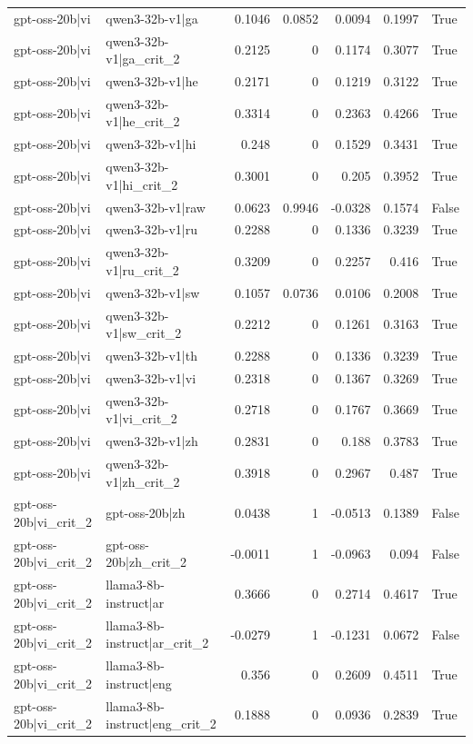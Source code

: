 \begin{table}
\begin{tabular}{l l r r r r l}
gpt-oss-20b|vi & qwen3-32b-v1|ga & 0.1046 & 0.0852 & 0.0094 & 0.1997 & True \\
gpt-oss-20b|vi & qwen3-32b-v1|ga_crit_2 & 0.2125 & 0 & 0.1174 & 0.3077 & True \\
gpt-oss-20b|vi & qwen3-32b-v1|he & 0.2171 & 0 & 0.1219 & 0.3122 & True \\
gpt-oss-20b|vi & qwen3-32b-v1|he_crit_2 & 0.3314 & 0 & 0.2363 & 0.4266 & True \\
gpt-oss-20b|vi & qwen3-32b-v1|hi & 0.248 & 0 & 0.1529 & 0.3431 & True \\
gpt-oss-20b|vi & qwen3-32b-v1|hi_crit_2 & 0.3001 & 0 & 0.205 & 0.3952 & True \\
gpt-oss-20b|vi & qwen3-32b-v1|raw & 0.0623 & 0.9946 & -0.0328 & 0.1574 & False \\
gpt-oss-20b|vi & qwen3-32b-v1|ru & 0.2288 & 0 & 0.1336 & 0.3239 & True \\
gpt-oss-20b|vi & qwen3-32b-v1|ru_crit_2 & 0.3209 & 0 & 0.2257 & 0.416 & True \\
gpt-oss-20b|vi & qwen3-32b-v1|sw & 0.1057 & 0.0736 & 0.0106 & 0.2008 & True \\
gpt-oss-20b|vi & qwen3-32b-v1|sw_crit_2 & 0.2212 & 0 & 0.1261 & 0.3163 & True \\
gpt-oss-20b|vi & qwen3-32b-v1|th & 0.2288 & 0 & 0.1336 & 0.3239 & True \\
gpt-oss-20b|vi & qwen3-32b-v1|vi & 0.2318 & 0 & 0.1367 & 0.3269 & True \\
gpt-oss-20b|vi & qwen3-32b-v1|vi_crit_2 & 0.2718 & 0 & 0.1767 & 0.3669 & True \\
gpt-oss-20b|vi & qwen3-32b-v1|zh & 0.2831 & 0 & 0.188 & 0.3783 & True \\
gpt-oss-20b|vi & qwen3-32b-v1|zh_crit_2 & 0.3918 & 0 & 0.2967 & 0.487 & True \\
gpt-oss-20b|vi_crit_2 & gpt-oss-20b|zh & 0.0438 & 1 & -0.0513 & 0.1389 & False \\
gpt-oss-20b|vi_crit_2 & gpt-oss-20b|zh_crit_2 & -0.0011 & 1 & -0.0963 & 0.094 & False \\
gpt-oss-20b|vi_crit_2 & llama3-8b-instruct|ar & 0.3666 & 0 & 0.2714 & 0.4617 & True \\
gpt-oss-20b|vi_crit_2 & llama3-8b-instruct|ar_crit_2 & -0.0279 & 1 & -0.1231 & 0.0672 & False \\
gpt-oss-20b|vi_crit_2 & llama3-8b-instruct|eng & 0.356 & 0 & 0.2609 & 0.4511 & True \\
gpt-oss-20b|vi_crit_2 & llama3-8b-instruct|eng_crit_2 & 0.1888 & 0 & 0.0936 & 0.2839 & True \\

\end{tabular}
\end{table}
